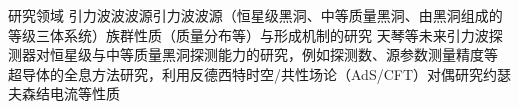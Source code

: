 
\begin{rubric}{研究领域}
    \entry*[天体物理]
    引力波波波源引力波波源（恒星级黑洞、中等质量黑洞、由黑洞组成的等级三体系统）族群性质（质量分布等）与形成机制的研究 
    \entry*[天体物理]
    天琴等未来引力波探测器对恒星级与中等质量黑洞探测能力的研究，例如探测数、源参数测量精度等
    \entry*[理论物理]
    超导体的全息方法研究，利用反德西特时空/共性场论（AdS/CFT）对偶研究约瑟夫森结电流等性质 
\end{rubric}
